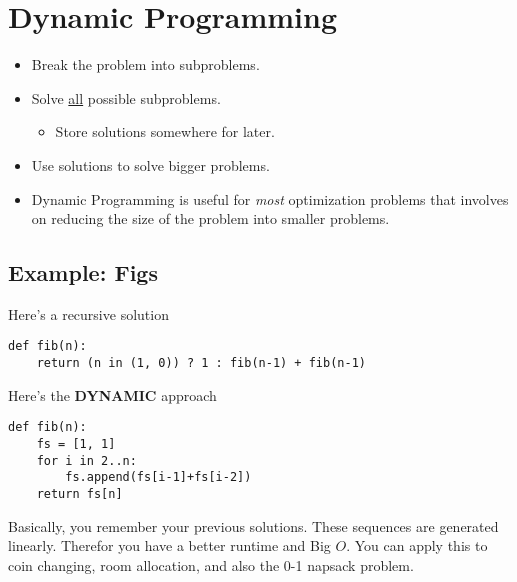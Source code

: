 \documentclass{article}
\begin{document}
\section{Dynamic Programming}
\label{sec:orgaadd643}
\begin{itemize}
\item Break the problem into subproblems.
\item Solve \uline{all} possible subproblems.
\begin{itemize}
\item Store solutions somewhere for later.
\end{itemize}
\item Use solutions to solve bigger problems.
\item Dynamic Programming is useful for \emph{most} optimization problems that involves on reducing the size of the problem into smaller problems.
\end{itemize}

\subsection{Example: \textbf{Figs}}
\label{sec:org2b36b3c}
Here's a recursive solution
\begin{verbatim}
def fib(n):
    return (n in (1, 0)) ? 1 : fib(n-1) + fib(n-1)
\end{verbatim}
Here's the \textbf{DYNAMIC} approach
\begin{verbatim}
def fib(n):
    fs = [1, 1]
    for i in 2..n:
        fs.append(fs[i-1]+fs[i-2])
    return fs[n]
\end{verbatim}

Basically, you remember your previous solutions. These sequences are generated linearly. Therefor you have a better runtime and Big \(O\).
You can apply this to coin changing, room allocation, and also the 0-1 napsack problem.
\end{document}
